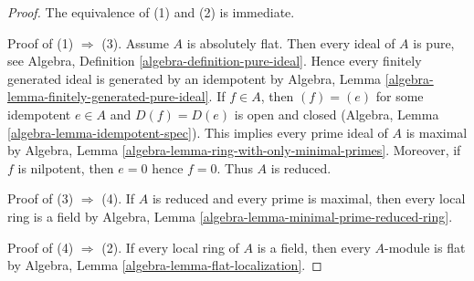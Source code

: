 \documentclass[10pt,a4paper]{amsart}
\theoremstyle{plain}
\theoremstyle{definition}
\theoremstyle{remark}
\numberwithin{equation}{subsection}
\begin{document}
\begin{proof}
The equivalence of (1) and (2) is immediate.

\medskip\noindent
Proof of (1) $\Rightarrow$ (3).
Assume $A$ is absolutely flat. Then every ideal of $A$ is pure, see
Algebra, Definition \ref{algebra-definition-pure-ideal}.
Hence every finitely generated ideal is generated by an idempotent by
Algebra, Lemma \ref{algebra-lemma-finitely-generated-pure-ideal}.
If $f \in A$, then $(f) = (e)$ for some idempotent $e \in A$
and $D(f) = D(e)$ is open and closed
(Algebra, Lemma \ref{algebra-lemma-idempotent-spec}).
This implies every prime ideal of $A$ is maximal by
Algebra, Lemma \ref{algebra-lemma-ring-with-only-minimal-primes}.
Moreover, if $f$ is nilpotent, then $e = 0$ hence $f = 0$.
Thus $A$ is reduced.

\medskip\noindent
Proof of (3) $\Rightarrow$ (4). If $A$ is reduced and every prime is
maximal, then every local ring is a field by
Algebra, Lemma \ref{algebra-lemma-minimal-prime-reduced-ring}.

\medskip\noindent
Proof of (4) $\Rightarrow$ (2). If every local ring of $A$ is a field,
then every $A$-module is flat by
Algebra, Lemma \ref{algebra-lemma-flat-localization}.
\end{proof}
\end{document}
